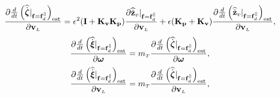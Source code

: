 \documentclass[journal,onecolumn]{IEEEtran}
\begin{document}
	\begin{equation}
		\frac{\partial\frac{d}{dt}\LP\widehat{\dot{\bs{\zeta}}}|_{\f=\fd^{\|}}\RP_{\text{est}}}{\partial\vL} = \epsilon^2( {\bf I} + {\bf K_v}{\bf K_p})\frac{\partial\zvdothat|_{\f=\fd^{\|}}}{\partial\vL} + \epsilon( {\bf K_p} + {\bf K_v} )\frac{\partial\frac{d}{dt}\LP\zvdothatdot|_{\f=\fd^{\|}}\RP_{\text{est}}}{\partial\vL},
	\end{equation}
	\begin{equation}
		\frac{\partial\frac{d}{dt}\LP\widehat{\dot{\Xiq}}|_{\f=\fd^{\|}}\RP_{\text{est}}}{\partial\wL} = \mT\frac{\partial\frac{d}{dt}\LP\widehat{\dot{\bs{\zeta}}}|_{\f=\fd^{\|}}\RP_{\text{est}}}{\partial\wL},
	\end{equation}
	\begin{equation}
		\frac{\partial\frac{d}{dt}\LP\widehat{\dot{\Xiq}}|_{\f=\fd^{\|}}\RP_{\text{est}}}{\partial\vL} = \mT\frac{\partial\frac{d}{dt}\LP\widehat{\dot{\bs{\zeta}}}|_{\f=\fd^{\|}}\RP_{\text{est}}}{\partial\vL},
	\end{equation}
\end{document}
